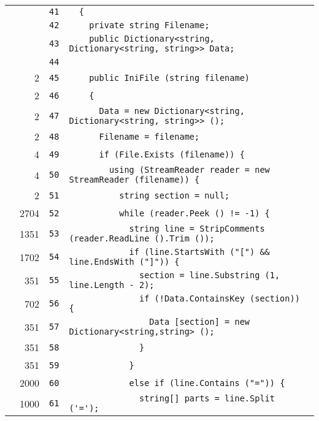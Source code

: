 \documentclass[a4paper,10pt]{article}
\begin{document}
\begin{longtable}[l]{lrrl}
\cellcolor{gray} &  & \verb~41~ & \verb~  {~\\
\cellcolor{gray} &  & \verb~42~ & \verb~    private string Filename;~\\
\cellcolor{gray} &  & \verb~43~ & \verb~    public Dictionary<string, Dictionary<string, string>> Data;~\\
\cellcolor{gray} &  & \verb~44~ & \verb~~\\
\cellcolor{green} & 2 & \verb~45~ & \verb~    public IniFile (string filename)~\\
\cellcolor{green} & 2 & \verb~46~ & \verb~    {~\\
\cellcolor{green} & 2 & \verb~47~ & \verb~      Data = new Dictionary<string, Dictionary<string, string>> ();~\\
\cellcolor{green} & 2 & \verb~48~ & \verb~      Filename = filename;~\\
\cellcolor{green} & 4 & \verb~49~ & \verb~      if (File.Exists (filename)) {~\\
\cellcolor{green} & 4 & \verb~50~ & \verb~        using (StreamReader reader = new StreamReader (filename)) {~\\
\cellcolor{green} & 2 & \verb~51~ & \verb~          string section = null;~\\
\cellcolor{green} & 2704 & \verb~52~ & \verb~          while (reader.Peek () != -1) {~\\
\cellcolor{green} & 1351 & \verb~53~ & \verb~            string line = StripComments (reader.ReadLine ().Trim ());~\\
\cellcolor{green} & 1702 & \verb~54~ & \verb~            if (line.StartsWith ("[") && line.EndsWith ("]")) {~\\
\cellcolor{green} & 351 & \verb~55~ & \verb~              section = line.Substring (1, line.Length - 2);~\\
\cellcolor{green} & 702 & \verb~56~ & \verb~              if (!Data.ContainsKey (section)) {~\\
\cellcolor{green} & 351 & \verb~57~ & \verb~                Data [section] = new Dictionary<string,string> ();~\\
\cellcolor{green} & 351 & \verb~58~ & \verb~              }~\\
\cellcolor{green} & 351 & \verb~59~ & \verb~            }~\\
\cellcolor{green} & 2000 & \verb~60~ & \verb~            else if (line.Contains ("=")) {~\\
\cellcolor{green} & 1000 & \verb~61~ & \verb~              string[] parts = line.Split ('=');~\\

\end{longtable}
\end{document}
